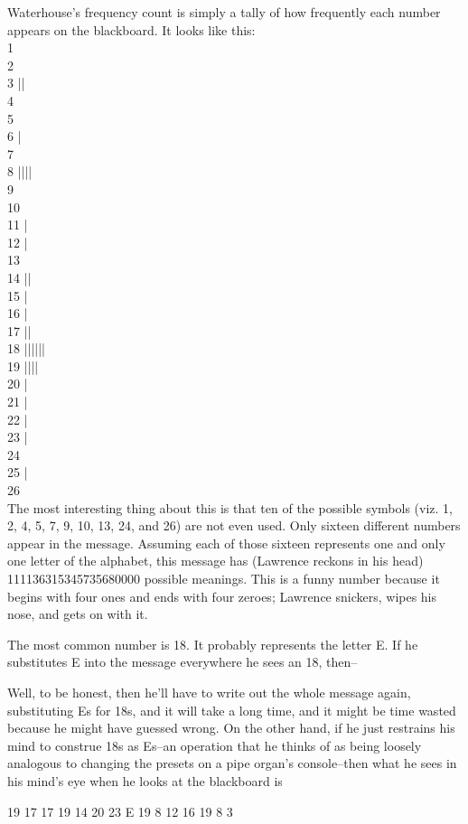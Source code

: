 \documentclass{42-en}
\begin{document}
Waterhouse's frequency count is simply a tally of how frequently each number appears on the blackboard. It looks like this: \\
1\\
2\\
3 ||\\
4\\
5\\
6 |\\
7\\
8 ||||\\
9\\
10\\
11 |\\
12 |\\
13\\
14 ||\\
15 |\\
16 |\\
17 ||\\
18 ||||||\\
19 ||||\\
20 |\\
21 |\\
22 |\\
23 |\\
24\\
25 |\\
26\\
The most interesting thing about this is that ten of the possible symbols (viz. 1, 2, 4, 5, 7, 9, 10, 13, 24, and 26) are not even used. Only sixteen different numbers appear in the message. Assuming each of those sixteen represents one and only one letter of the alphabet, this message has (Lawrence reckons in his head) 111136315345735680000 possible meanings. This is a funny number because it begins with four ones and ends with four zeroes; Lawrence snickers, wipes his nose, and gets on with it.

The most common number is 18. It probably represents the letter E. If he substitutes E into the message everywhere he sees an 18, then--

Well, to be honest, then he'll have to write out the whole message again, substituting Es for 18s, and it will take a long time, and it might be time wasted because he might have guessed wrong. On the other hand, if he just restrains his mind to construe 18s as Es--an operation that he thinks of as being loosely analogous to changing the presets on a pipe organ's console--then what he sees in his mind's eye when he looks at the blackboard is

19 17 17 19 14	20 23 E 19 8	12 16 19 8 3
\end{document}
